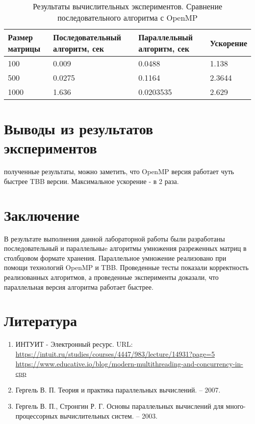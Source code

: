 \documentclass{report}
\begin{document}
\begin{table}[!h]
\caption{Результаты вычислительных экспериментов. Сравнение последовательного алгоритма с OpenMP}
\centering
\begin{tabular}{|p{4cm}|p{4cm}|p{4cm}|p{3cm}|}
\hline
Размер матрицы & Последовательный алгоритм, сек & Параллельный алгоритм, сек & Ускорение  \\\hline
100  & 0.009 & 0.0488 & 1.138  \\\hline
500  & 0.0275 & 0.1164 & 2.3644  \\\hline
1000  & 1.636 & 0.0203535 & 2.629  \\
\hline
\end{tabular}
\end{table}

\newpage

\section*{Выводы из результатов экспериментов}
 полученные результаты, можно заметить, что OpenMP версия работает чуть быстрее TBB  версии. Максимальное ускорение - в  2  раза.
\newpage

\section*{Заключение}
В результате выполнения   данной лабораторной работы были разработаны последовательный и параллельныe алгоритмы умножения разреженных матриц в столбцовом формате хранения. Параллельное умножение реализовано при помощи технологий OpenMP и TBB. Проведенные тесты показали корректность реализованных алгоритмов, а проведенные эксперименты доказали, что параллельная версия алгоритма работает быстрее.

\newpage

\section*{Литература}
\begin{enumerate}
\item ИНТУИТ - Электронный ресурс. URL: \newline \url{https://intuit.ru/studies/courses/4447/983/lecture/14931?page=5}
 \url{https://www.educative.io/blog/modern-multithreading-and-concurrency-in-cpp}
\item Гергель В. П. Теория и практика параллельных вычислений. – 2007.
\item  Гергель В. П., Стронгин Р. Г. Основы параллельных вычислений для много-
процессорных вычислительных систем. – 2003.
\end{enumerate} 
\newpage
\end{document}
